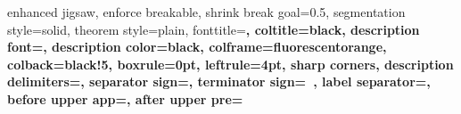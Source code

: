 %
{enhanced jigsaw,%
	enforce breakable,%
	shrink break goal=0.5\baselineskip,%
	segmentation style=solid,%
	theorem style=plain,%
	fonttitle=\sffamily\upshape\bfseries\small,%
	coltitle=black,%
	description font=\sffamily\upshape\bfseries\small,%
	description color=black,%
	colframe=fluorescentorange,%
	colback=black!5,%
	boxrule=0pt,%
	leftrule=4pt,%
	sharp corners,%
	description delimiters={}{},%
	separator sign={\nobreakspace {\color{black}---}},%
	terminator sign={\ },%
	label separator=,
	before upper app={},%
	after upper pre={\popdimen{\parindent}}}%
{}


\newenvironment{rmk}{
	\par%
	\vspace*{0pt plus 3pt minus 3pt} %
	\small %
	\begin{list}{}{
			\leftmargin=35pt %
			\rightmargin=25pt%
			\ignorespaces}%
		\item %
		\makebox[-2.5pt]{%
			\begin{tikzpicture}[overlay]
			\node[draw=ocre!60,line width=1pt,circle,fill=ocre!25,font=\sffamily\bfseries,inner sep=2pt,outer sep=0pt] at (-15pt,0pt){\textcolor{ocre}{R}};%
			\end{tikzpicture}
		} %
		\advance\baselineskip -1pt%
		\noindent%
		\unskip\unskip\unskip\unskip\unskip\unskip\unskip\unskip\unskip\unskip\unskip\unskip\unskip\unskip\unskip\unskip\unskip\unskip\unskip\unskip\unskip\unskip\unskip\unskip\unskip\unskip\unskip\unskip\unskip\unskip\unskip\unskip%
	}%
	{%
	\end{list}%
	\vspace*{0pt plus 3pt minus 3pt} %
}


